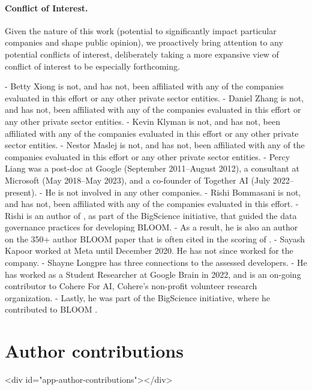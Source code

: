 \documentclass[screen, authorversion, acmsmall]{acmart}
\begin{document}
\paragraph{Conflict of Interest.}
Given the nature of this work (\eg potential to significantly impact particular companies and shape public opinion), we proactively bring attention to any potential conflicts of interest, deliberately taking a more expansive view of conflict of interest to be especially forthcoming.

-  Betty Xiong is not, and has not, been affiliated with any of the companies evaluated in this effort or any other private sector entities.
-  Daniel Zhang is not, and has not, been affiliated with any of the companies evaluated in this effort or any other private sector entities.
-  Kevin Klyman is not, and has not, been affiliated with any of the companies evaluated in this effort or any other private sector entities.
-  Nestor Maslej is not, and has not, been affiliated with any of the companies evaluated in this effort or any other private sector entities.
-  Percy Liang was a post-doc at Google (September 2011--August 2012), a consultant at Microsoft (May 2018--May 2023), and a co-founder of Together AI (July 2022--present).
- He is not involved in any other companies.
-  Rishi Bommasani is not, and has not, been affiliated with any of the companies evaluated in this effort.
- Rishi is an author of \citet{jernite2022governance}, as part of the BigScience initiative, that guided the data governance practices for developing BLOOM.
- As a result, he is also an author on the 350+ author BLOOM paper \citep{scao2022bloom} that is often cited in the scoring of \bloomz.
-  Sayash Kapoor worked at Meta until December 2020. He has not since worked for the company.
-  Shayne Longpre has three connections to the assessed developers.
- He has worked as a Student Researcher at Google Brain in 2022, and is an on-going contributor to Cohere For AI, Cohere's non-profit volunteer research organization.
- Lastly, he was part of the BigScience initiative, where he contributed to BLOOM \citep{scao2022bloom}.

\newpage



\clearpage
\appendix

\hypertarget{author-contributions}{\section{Author contributions}}
<div id="app-author-contributions"></div>
\end{document}
